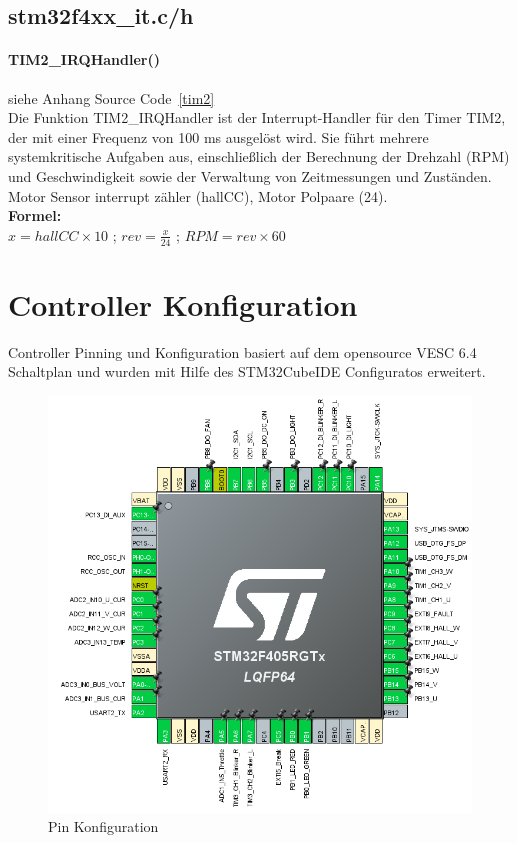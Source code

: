 \documentclass[paper=a4,11pt]{scrreprt}
\begin{document}
\subsection{stm32f4xx\_it.c/h}
\paragraph{\textbf{TIM2\_IRQHandler()}} siehe Anhang Source Code~\ref{tim2}\\
Die Funktion TIM2\_IRQHandler ist der Interrupt-Handler für den Timer TIM2, der mit einer Frequenz von 100 ms ausgelöst wird. Sie führt mehrere systemkritische Aufgaben aus, einschließlich der Berechnung der Drehzahl (RPM) und Geschwindigkeit sowie der Verwaltung von Zeitmessungen und Zuständen. Motor Sensor interrupt zähler (hallCC), Motor Polpaare (24).\\
\textbf{Formel:}\\
$x = hallCC \times 10 $ ; $rev = \frac{x}{24}$ ; $RPM = rev \times 60$
\newpage
\section{Controller Konfiguration}
Controller Pinning und Konfiguration basiert auf dem opensource VESC 6.4 Schaltplan und wurden mit Hilfe des STM32CubeIDE Configuratos erweitert.
\begin{figure}[ht]
\begin{center}
\includegraphics[width=14cm]{Bilder/ControlerConfig.PNG}
\caption{Pin Konfiguration}
\label{pinning}
\end{center}
\end{figure}
\end{document}
